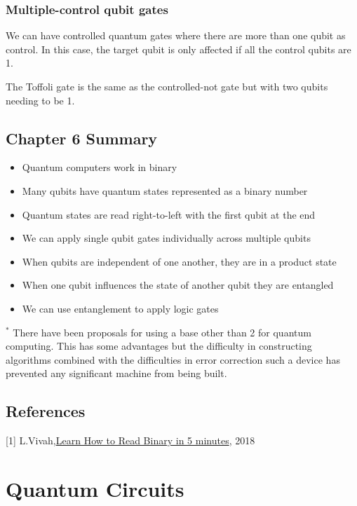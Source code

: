 \documentclass{book}
\begin{document}
\subsection{Multiple-control qubit gates }

We can have controlled quantum gates where there are more than one qubit as control. In this case, the target qubit is only affected if all the control qubits are 1. 

The Toffoli gate is the same as the controlled-not gate but with two qubits needing to be 1.

\section{Chapter 6 Summary}

\begin{itemize}
    \item Quantum computers work in binary
    \item Many qubits have quantum states represented as a binary number
    \item Quantum states are read right-to-left with the first qubit at the end
    \item We can apply single qubit gates individually across multiple qubits 
    \item When qubits are independent of one another, they are in a product state
    \item When one qubit influences the state of another qubit they are entangled 
    \item We can use entanglement to apply logic gates
\end{itemize}



$^*$ There have been proposals for using a base other than 2 for quantum computing. This has some advantages but the difficulty in constructing algorithms combined with the difficulties in error correction such a device has prevented any significant machine from being built.
\section{References}

[1] L.Vivah,\href{https://medium.com/@LindaVivah/learn-how-to-read-binary-in-5-minutes-dac1feb991e}{Learn How to Read Binary in 5 minutes}, 2018

\chapter{Quantum Circuits}
\end{document}
